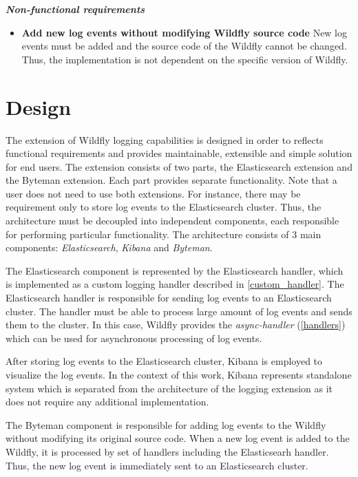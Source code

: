 \documentclass[12pt,oneside]{fithesis2}
\begin{document}
\noindent
\textit{\textbf{Non-functional requirements}}
\begin{itemize}
	\item \textbf{Add new log events without modifying Wildfly source code} \newline
	New log events must be added and the source code of the Wildfly cannot be changed. Thus, the implementation is not dependent on the specific version of Wildfly.
\end{itemize}

\section{Design}
The extension of Wildfly logging capabilities is designed in order to reflects functional requirements and provides maintainable, extensible and simple solution for end users. The extension consists of two parts, the Elasticsearch extension and the Byteman extension. Each part provides separate functionality. Note that a user does not need to use both extensions. For instance, there may be requirement only to store log events to the Elasticsearch cluster. Thus, the architecture must be decoupled into independent components, each responsible for performing particular functionality. The architecture consists of 3 main components: \textit{Elasticsearch}, \textit{Kibana} and \textit{Byteman}.

The Elasticsearch component is represented by the  Elasticsearch handler, which is implemented as a custom logging handler described in \ref{custom_handler}. The Elasticsearch handler is responsible for sending log events to an Elasticsearch cluster. The handler must be able to process large amount of log events and sends them to the cluster. In this case, Wildfly provides the \textit{async-handler} (\ref{handlers}) which can be used for asynchronous processing of log events.

After storing log events to the Elasticsearch cluster, Kibana is employed to visualize the log events. In the context of this work, Kibana represents standalone system which is separated from the architecture of the logging extension as it does not require any additional implementation.

The Byteman component is responsible for adding log events to the Wildfly without modifying its original source code. When a new log event is added to the Wildfly, it is processed by set of handlers including the Elasticsearh handler. Thus, the new log event is immediately sent to an Elasticsearch cluster.
\end{document}
